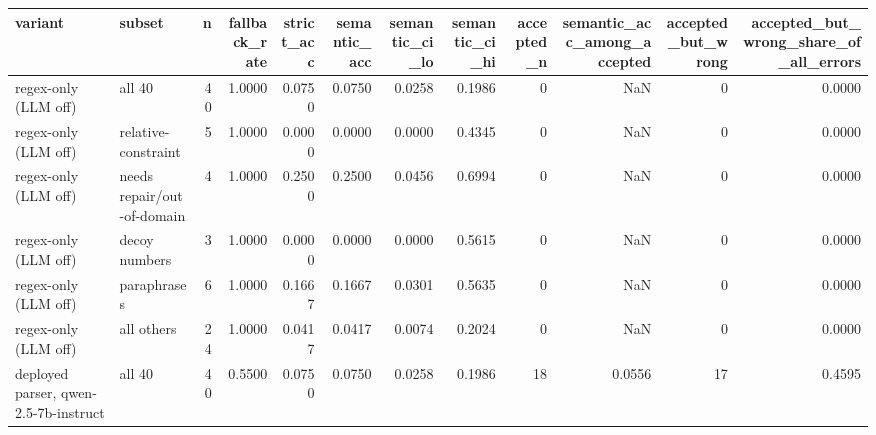 \begin{tabular}{llrrrrrrrrrr}
\toprule
                                          variant &                     subset &  n &  fallback\_rate &  strict\_acc &  semantic\_acc &  semantic\_ci\_lo &  semantic\_ci\_hi &  accepted\_n &  semantic\_acc\_among\_accepted &  accepted\_but\_wrong &  accepted\_but\_wrong\_share\_of\_all\_errors \\
\midrule
                             regex-only (LLM off) &                     all 40 & 40 &         1.0000 &      0.0750 &        0.0750 &          0.0258 &          0.1986 &           0 &                          NaN &                   0 &                                  0.0000 \\
                             regex-only (LLM off) &        relative-constraint &  5 &         1.0000 &      0.0000 &        0.0000 &          0.0000 &          0.4345 &           0 &                          NaN &                   0 &                                  0.0000 \\
                             regex-only (LLM off) & needs repair/out-of-domain &  4 &         1.0000 &      0.2500 &        0.2500 &          0.0456 &          0.6994 &           0 &                          NaN &                   0 &                                  0.0000 \\
                             regex-only (LLM off) &              decoy numbers &  3 &         1.0000 &      0.0000 &        0.0000 &          0.0000 &          0.5615 &           0 &                          NaN &                   0 &                                  0.0000 \\
                             regex-only (LLM off) &                paraphrases &  6 &         1.0000 &      0.1667 &        0.1667 &          0.0301 &          0.5635 &           0 &                          NaN &                   0 &                                  0.0000 \\
                             regex-only (LLM off) &                 all others & 24 &         1.0000 &      0.0417 &        0.0417 &          0.0074 &          0.2024 &           0 &                          NaN &                   0 &                                  0.0000 \\
            deployed parser, qwen-2.5-7b-instruct &                     all 40 & 40 &         0.5500 &      0.0750 &        0.0750 &          0.0258 &          0.1986 &          18 &                       0.0556 &                  17 &                                  0.4595 \\

\end{tabular}
